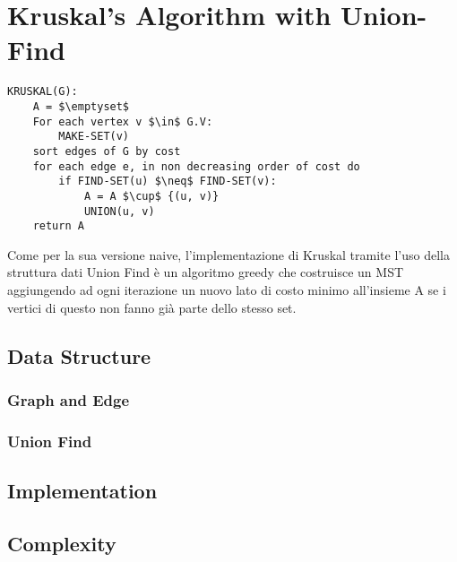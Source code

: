 \section{Kruskal's Algorithm with Union-Find}\label{kruskal_uf}

\begin{lstlisting}[mathescape=true]
KRUSKAL(G):
	A = $\emptyset$
	For each vertex v $\in$ G.V:
		MAKE-SET(v)
	sort edges of G by cost
	for each edge e, in non decreasing order of cost do	
		if FIND-SET(u) $\neq$ FIND-SET(v):       
			A = A $\cup$ {(u, v)}
			UNION(u, v)
	return A
\end{lstlisting}

Come per la sua versione naive, l'implementazione di Kruskal tramite l'uso della struttura dati Union Find è un algoritmo greedy che costruisce un MST aggiungendo ad ogni iterazione un nuovo lato di costo minimo all'insieme A se i vertici di questo non fanno già parte dello stesso set.

\subsection{Data Structure}

	\subsubsection{Graph and Edge}
	
	
	\subsubsection{Union Find}
		

	\subsection{Implementation}
		
	
	\subsection{Complexity}
	

\pagebreak